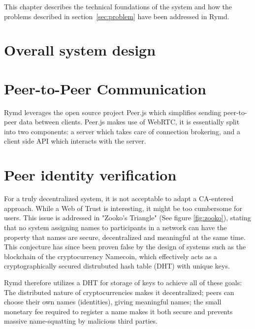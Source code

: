 This chapter describes the technical foundations of the system and how the problems described in section~\ref{sec:problem} have been addressed in Rymd.

\section{Overall system design}


\section{Peer-to-Peer Communication}
\label{sec:p2p}


Rymd leverages the open source project Peer.js which simplifies sending peer-to-peer data between clients. Peer.js makes use of WebRTC, it is essentially split into two components: a server which takes care of connection brokering, and a client side API which interacts with the server.


\section{Peer identity verification}
\label{sec:authorization}

For a truly decentralized system, it is not acceptable to adapt a CA-entered approach. While a Web of Trust is interesting, it might be too cumbersome for users. This issue is addressed in "Zooko's Triangle" (See figure \ref{fig:zooko}), stating that no system assigning names to participants in a network can have the property that names are secure, decentralized and meaningful at the same time. This conjecture has since been proven false by the design of systems such as the blockchain of the cryptocurrency Namecoin, which effectively acts as a cryptographically secured distrubuted hash table (DHT) with unique keys.

Rymd therefore utilizes a DHT for storage of keys to achieve all of these goals: The distributed nature of cryptocurrencies makes it decentralized; peers can choose their own names (identities), giving meaningful names; the small monetary fee required to register a name makes it both secure and prevents massive name-squatting by malicious third parties.

